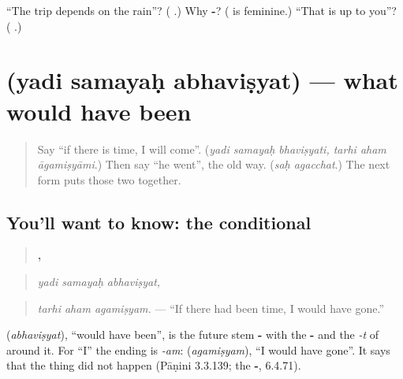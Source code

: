 \begin{tcolorbox}[breakable,colback=teal!4,colframe=teal!35!black,title={Before you move on}]
\textquotedblleft{}The trip depends on the rain\textquotedblright{}? (\textbf{ }.) Why \textbf{-}? (\textbf{} is feminine.) \textquotedblleft{}That is up to you\textquotedblright{}? (\textbf{ }.)
\end{tcolorbox}
\section[\texorpdfstring{\sk{यदि} \sk{समयः} \sk{अभविष्यत्} (yadi samayaḥ …)}{यदि समयः अभविष्यत् (yadi samayaḥ …)}]{   (yadi samayaḥ abhaviṣyat) — what would have been}

\label{lesson:SA-C285-yadi-samayah-abhavisyat}



\begin{quote}
Say \textquotedblleft{}if there is time, I will come\textquotedblright{}. (\emph{yadi samayaḥ bhaviṣyati, tarhi aham āgamiṣyāmi}.) Then say \textquotedblleft{}he went\textquotedblright{}, the old way. (\emph{saḥ agacchat}.) The next form puts those two together.
\end{quote}

\subsection*{You'll want to know: the conditional}
\begin{quote}
\textbf{  ,}
\end{quote}

\begin{quote}
\emph{yadi samayaḥ abhaviṣyat,}
\end{quote}

\begin{quote}
\textbf{  }
\end{quote}

\begin{quote}
\emph{tarhi aham agamiṣyam.} — \textquotedblleft{}If there had been time, I would have gone.\textquotedblright{}
\end{quote}

\textbf{} (\emph{abhaviṣyat}), \textquotedblleft{}would have been\textquotedblright{}, is the future stem \textbf{-} with the \textbf{-} and the \emph{-t} of \textbf{} around it. For \textquotedblleft{}I\textquotedblright{} the ending is \emph{-am}: \textbf{} (\emph{agamiṣyam}), \textquotedblleft{}I would have gone\textquotedblright{}. It says that the thing did not happen (Pāṇini 3.3.139; the \textbf{-}, 6.4.71).

